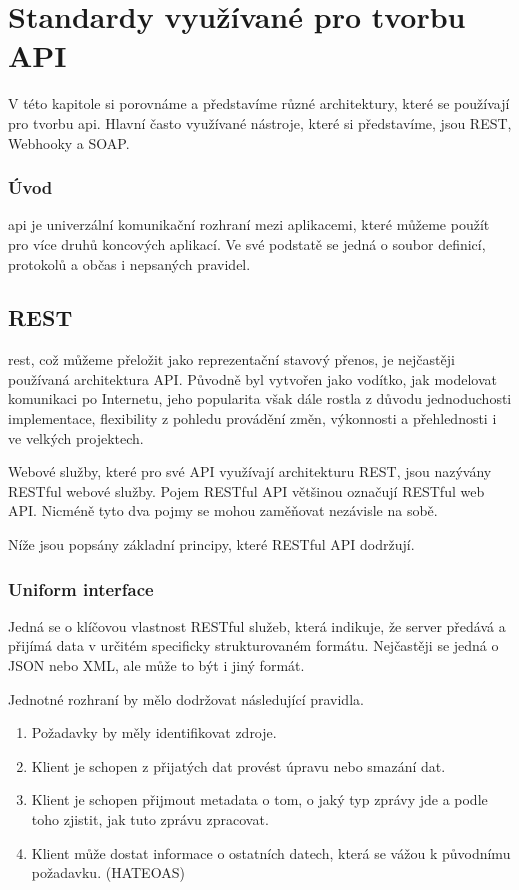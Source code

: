 \chapter{Standardy využívané pro tvorbu API}
V této kapitole si porovnáme a představíme různé architektury, které se používají pro tvorbu \gls{api}.
Hlavní často využívané nástroje, které si představíme, jsou REST, Webhooky a SOAP.

\subsection*{Úvod}
\gls{api} je univerzální komunikační rozhraní mezi aplikacemi, které můžeme použít pro více druhů koncových aplikací. Ve své podstatě se jedná o soubor definicí, protokolů a občas i nepsaných pravidel.

\section{REST}
\gls{rest}, což můžeme přeložit jako reprezentační stavový přenos, je nejčastěji používaná architektura API. Původně byl vytvořen jako vodítko, jak modelovat komunikaci po Internetu, jeho popularita však dále rostla z důvodu jednoduchosti implementace, flexibility z pohledu provádění změn, výkonnosti a přehlednosti i ve velkých projektech.

Webové služby, které pro své API využívají architekturu REST, jsou nazývány RESTful webové služby. Pojem RESTful API většinou označují RESTful web API. Nicméně tyto dva pojmy se mohou zaměňovat nezávisle na sobě.

Níže jsou popsány základní principy, které RESTful API dodržují.

\subsection{Uniform interface}
Jedná se o klíčovou vlastnost RESTful služeb, která indikuje, že server předává a přijímá data v určitém specificky strukturovaném formátu. Nejčastěji se jedná o JSON nebo XML, ale může to být i jiný formát.

Jednotné rozhraní by mělo dodržovat následující pravidla.\
\begin{enumerate}
    \item Požadavky by měly identifikovat zdroje.
    \item Klient je schopen z přijatých dat provést úpravu nebo smazání dat.
    \item Klient je schopen přijmout metadata o tom, o jaký typ zprávy jde a podle toho zjistit, jak tuto zprávu zpracovat.
    \item Klient může dostat informace o ostatních datech, která se vážou k původnímu požadavku. (HATEOAS)
\end{enumerate}

